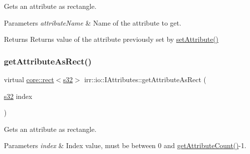 Gets an attribute as rectangle. 


\begin{DoxyParams}{Parameters}
{\em attribute\+Name} & Name of the attribute to get. \\
\hline
\end{DoxyParams}
\begin{DoxyReturn}{Returns}
Returns value of the attribute previously set by \hyperlink{classirr_1_1io_1_1IAttributes_a03fa31acb481ae23678676cc183f09a6}{set\+Attribute()} 
\end{DoxyReturn}
\mbox{\label{classirr_1_1io_1_1IAttributes_af8efe18246d51e968da7d6380515dcd1}} 
\subsubsection{\texorpdfstring{get\+Attribute\+As\+Rect()}{getAttributeAsRect()}\hspace{0.1cm}{\footnotesize\ttfamily [3/4]}}
{\footnotesize\ttfamily virtual \hyperlink{classirr_1_1core_1_1rect}{core\+::rect}$<$\hyperlink{namespaceirr_ac66849b7a6ed16e30ebede579f9b47c6}{s32}$>$ irr\+::io\+::\+I\+Attributes\+::get\+Attribute\+As\+Rect (\begin{DoxyParamCaption}\item[{\hyperlink{namespaceirr_ac66849b7a6ed16e30ebede579f9b47c6}{s32}}]{index }\end{DoxyParamCaption})\hspace{0.3cm}{\ttfamily [pure virtual]}}



Gets an attribute as rectangle. 


\begin{DoxyParams}{Parameters}
{\em index} & Index value, must be between 0 and \hyperlink{classirr_1_1io_1_1IAttributes_a796bdd9440ee7ba0b6742a90a82870b6}{get\+Attribute\+Count()}-\/1. \\
\hline
\end{DoxyParams}
\mbox{\label{classirr_1_1io_1_1IAttributes_af8efe18246d51e968da7d6380515dcd1}} 
